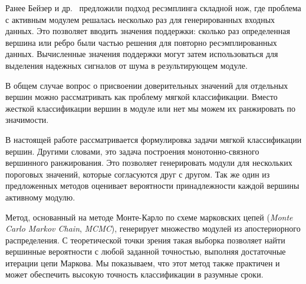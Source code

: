 Ранее Бейзер и др.~\cite{Beisser2012} предложили подход ресэмплинга складной
нож, где проблема с активным модулем решалась несколько раз для генерированных
входных данных.  Это позволяет вводить значения поддержки: сколько раз
определенная вершина или ребро были частью решения для повторно
ресэмплированных данных. Вычисленные значения поддержки могут затем
использоваться для выделения надежных сигналов от шума в результирующем модуле.

В общем случае вопрос о присвоении доверительных значений для отдельных вершин
можно рассматривать как проблему мягкой классификации. Вместо жесткой
классификации вершин в модуле или нет мы можем их ранжировать по значимости.


В настоящей работе рассматривается формулировка задачи мягкой классификации
вершин.  Другими словами, это задача построения монотонно-связного вершинного
ранжирования. Это позволяет генерировать модули для нескольких пороговых
значений, которые согласуются друг с другом. Так же один из предложенных
методов оценивает вероятности принадлежности каждой вершины активному модулю.


Метод, основанный на методе Монте-Карло по схеме марковских цепей (\emph{Monte
Carlo Markov Chain}, \emph{MCMC}), генерирует множество модулей из
апостериорного распределения.  С теоретической точки зрения такая выборка
позволяет найти вершинные вероятности с любой заданной точностью, выполняя
достаточные итерации цепи Маркова. Мы показываем, что этот метод также
практичен и может обеспечить высокую точность классификации в разумные сроки.



